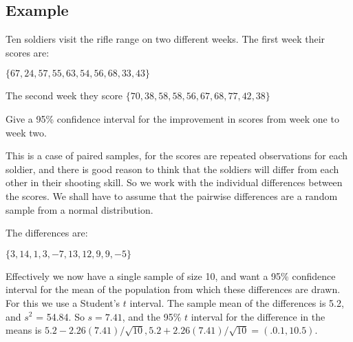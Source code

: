



\subsection*{Example}


Ten soldiers visit the rifle range on two different weeks. The first
week their scores are:


$\{67, 24, 57, 55, 63, 54, 56, 68, 33, 43\}$


The second week they score
$\{70, 38, 58, 58, 56, 67, 68, 77, 42, 38\}$


Give a 95\% confidence interval for the improvement in scores from week one to
week two.






This is a case of paired samples, for the scores are repeated observations for each
soldier, and there is good reason to think that the soldiers will differ from each other
in their shooting skill. So we work with the individual differences between the scores.
We shall have to assume that the pairwise differences are a random sample from a
normal distribution.


The differences are:


$\{3, 14, 1, 3, -7, 13, 12, 9, 9, -5\}$






Effectively we now have a single sample of size 10, and want a 95\% confidence
interval for the mean of the population from which these differences are drawn. For
this we use a Student's $t$ interval. The sample mean of the differences is 5.2, and
$s^2$ = 54.84. So $s = 7.41$, and the 95\% $t$ interval for the difference in the means is
$5.2 - 2.26(7.41)/\sqrt{10},  5.2 + 2.26(7.41)/\sqrt{10} = (.0.1, 10.5)$.





